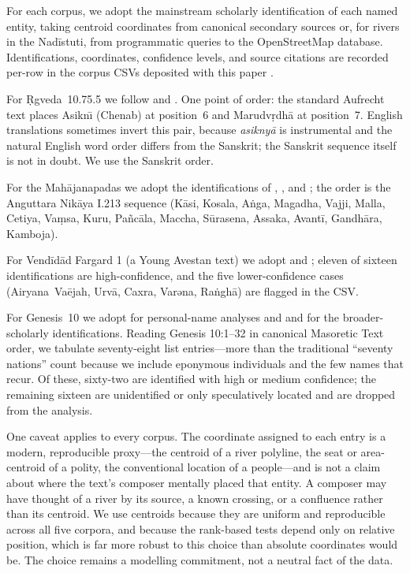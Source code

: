 \documentclass[11pt]{article}
\begin{document}
For each corpus, we adopt the mainstream scholarly identification of
each named entity, taking centroid coordinates from canonical
secondary sources or, for rivers in the Nadīstuti, from
programmatic queries to the OpenStreetMap database. Identifications,
coordinates, confidence levels, and source citations are recorded
per-row in the corpus CSVs deposited with this paper
\citep{repo2026}.

For Ṛgveda~10.75.5 we follow \citet{witzel1995} and
\citet{macdonell-keith1912}. One point of order: the standard
Aufrecht text places Asikn\={\i} (Chenab) at position~6 and
Marudv\d{r}dh\={a} at position~7. English translations sometimes
invert this pair, because \textit{asikny\={a}} is instrumental and
the natural English word order differs from the Sanskrit; the
Sanskrit sequence itself is not in doubt. We use the Sanskrit
order.

For the Mahājanapadas we adopt the identifications of
\citet{rhysdavids1903}, \citet{law1973}, and \citet{bronkhorst2007};
the order is the Anguttara Nikāya I.213 sequence
(Kāsi, Kosala, Aṅga, Magadha, Vajji, Malla, Cetiya, Vaṃsa, Kuru,
Pañcāla, Maccha, Sūrasena, Assaka, Avantī, Gandhāra, Kamboja).

For Vendīdād Fargard 1 (a Young Avestan text) we adopt
\citet{gnoli1980} and \citet{witzel2000homeland}; eleven of sixteen
identifications are high-confidence, and the five lower-confidence
cases (Airyana~Vaējah, Urvā, Caxra, Varəna, Ra\.{n}gh\={a}) are
flagged in the CSV.

For Genesis~10 we adopt \citet{hess1993} for personal-name analyses
and \citet{westermann1984} and \citet{wenham1987} for the
broader-scholarly identifications. Reading Genesis 10:1--32 in
canonical Masoretic Text order, we tabulate seventy-eight list
entries---more than the traditional ``seventy nations'' count
because we include eponymous individuals and the few names that
recur. Of these, sixty-two are identified with high or medium
confidence; the remaining sixteen are unidentified or only
speculatively located and are dropped from the analysis.

One caveat applies to every corpus. The coordinate assigned to each
entry is a modern, reproducible proxy---the centroid of a river
polyline, the seat or area-centroid of a polity, the conventional
location of a people---and is not a claim about where the text's
composer mentally placed that entity. A composer may have thought of
a river by its source, a known crossing, or a confluence rather than
its centroid. We use centroids because they are uniform and
reproducible across all five corpora, and because the rank-based
tests depend only on relative position, which is far more robust to
this choice than absolute coordinates would be. The choice remains a
modelling commitment, not a neutral fact of the data.
\end{document}
